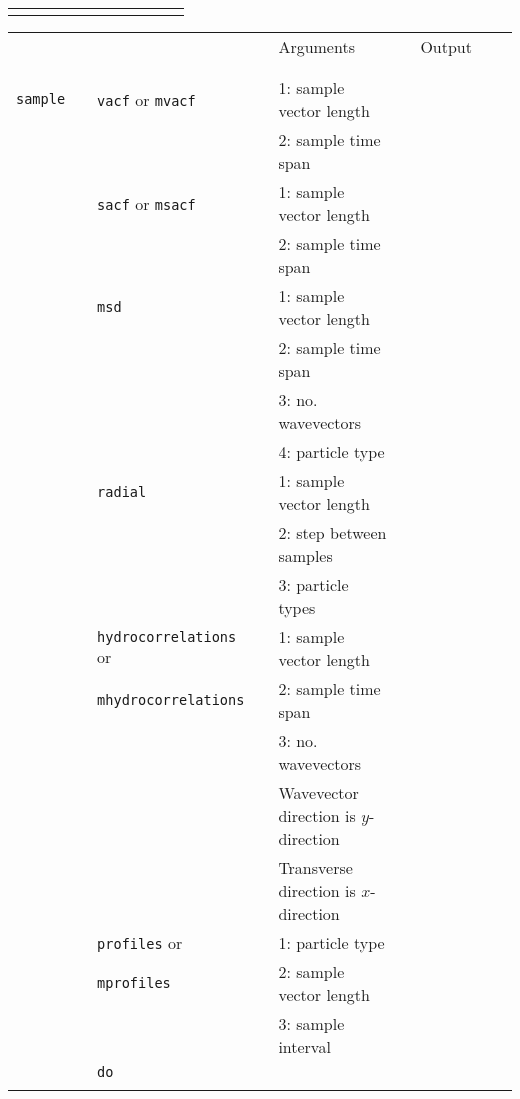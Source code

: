 \documentclass[11pt]{article}
\begin{document}
\begin{center}
\begin{tabular}{cclclclllcc}
								   && && && && \\
 
  \end{tabular}

\end{center}

\begin{center}
  
  \begin{tabular}{cclclclll}
    {\color{red}{\textbf{Action}}} && {\color{blue}{Specifier}} && Arguments && Output \\
                                   && && && \\
    \hline
                                   && && && \\

    \verb!sample! && \verb!vacf! or \verb!mvacf! &&  1: sample vector length && \\
    $\mbox{}$   && &&  2: sample time span && \\
    $\mbox{}$   && \verb!sacf! or \verb!msacf! &&1: sample vector length && \\
    $\mbox{}$   &&                   &&  2: sample time span && \\
    $\mbox{}$   && \verb!msd! && 1: sample vector length && \\
    $\mbox{}$   &&            &&  2: sample time span && \\
    $\mbox{}$   &&            &&  3: no. wavevectors && \\
    $\mbox{}$   &&            &&  4: particle type && \\
    $\mbox{}$   && \verb!radial! &&  1: sample vector length && \\
    $\mbox{}$   &&            &&  2: step between samples  && \\
    $\mbox{}$   &&            &&  3: particle types && \\
    $\mbox{}$   && \verb!hydrocorrelations! or && 1: sample vector length && \\
    $\mbox{}$   && \verb!mhydrocorrelations!  &&  2: sample time span && \\
    $\mbox{}$   &&            &&  3: no. wavevectors && \\
	$\mbox{}$   &&            &&  Wavevector direction is $y$-direction && \\
	$\mbox{}$   &&            &&  Transverse direction is $x$-direction && \\
    $\mbox{}$   && \verb!profiles! or &&1: particle type && \\
    $\mbox{}$   && \verb!mprofiles!    &&  2: sample vector length && \\
    $\mbox{}$   &&                   &&  3: sample interval && \\
    $\mbox{}$   && \verb!do!         &&  && \\
                                   && && && \\
    

\end{tabular}
\end{center}
\end{document}
